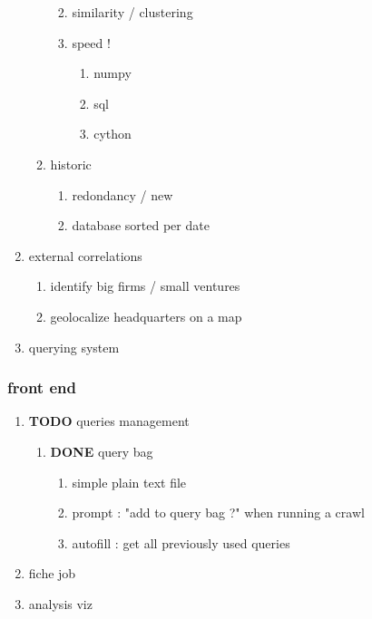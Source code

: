\documentclass[11pt]{article}
\begin{document}
\begin{enumerate}
\begin{enumerate}
\begin{enumerate}
\label{sec:orge2cd82d}
\item similarity / clustering
\label{sec:org14f9f39}
\item speed !
\label{sec:org60fff77}
\begin{enumerate}
\item numpy
\label{sec:org547e501}
\item sql
\label{sec:orgced6461}
\item cython
\label{sec:org6c77ffa}
\end{enumerate}
\end{enumerate}
\item historic
\label{sec:orga7bbd07}
\begin{enumerate}
\item redondancy / new
\label{sec:org9007280}
\item database sorted per date
\label{sec:org0233f70}
\end{enumerate}
\end{enumerate}
\item external correlations
\label{sec:org90fb522}
\begin{enumerate}
\item identify big firms / small ventures
\label{sec:orgc950745}
\item geolocalize headquarters on a map
\label{sec:org875997f}
\end{enumerate}
\item querying system
\label{sec:orgfd16ee8}
\end{enumerate}
\subsubsection{front end}
\label{sec:orgd3261f3}
\begin{enumerate}
\item {\bfseries\sffamily TODO} queries management
\label{sec:org4c8b4e9}
\begin{enumerate}
\item {\bfseries\sffamily DONE} query bag
\label{sec:org8e26722}
\begin{enumerate}
\item simple plain text file
\label{sec:org62f8685}
\item prompt : "add to query bag ?" when running a crawl
\label{sec:org4391664}
\item autofill : get all previously used queries
\label{sec:org89bbf7d}
\end{enumerate}
\end{enumerate}
\item fiche job
\label{sec:org069b2ae}
\item analysis viz
\label{sec:org599592e}
\end{enumerate}
\end{document}
